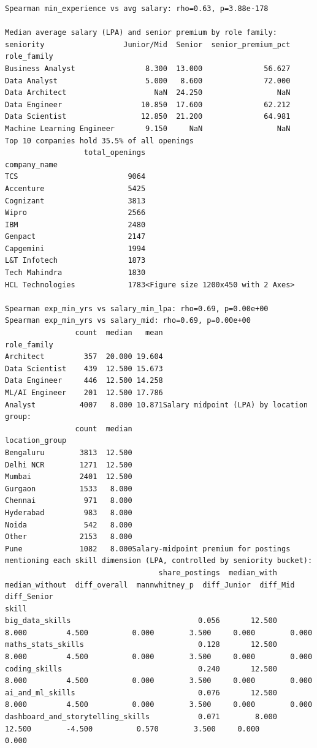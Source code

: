 \documentclass[conference]{IEEEtran}
\begin{document}
\begin{lstlisting}[style=outputstyle,caption={Execution Output G.9: Market Premiums and Strategic Alignment.},label={out:market_bridge}]
Spearman min_experience vs avg salary: rho=0.63, p=3.88e-178

Median average salary (LPA) and senior premium by role family:
seniority                  Junior/Mid  Senior  senior_premium_pct
role_family                                                      
Business Analyst                8.300  13.000              56.627
Data Analyst                    5.000   8.600              72.000
Data Architect                    NaN  24.250                 NaN
Data Engineer                  10.850  17.600              62.212
Data Scientist                 12.850  21.200              64.981
Machine Learning Engineer       9.150     NaN                 NaN
Top 10 companies hold 35.5% of all openings
                  total_openings
company_name                    
TCS                         9064
Accenture                   5425
Cognizant                   3813
Wipro                       2566
IBM                         2480
Genpact                     2147
Capgemini                   1994
L&T Infotech                1873
Tech Mahindra               1830
HCL Technologies            1783<Figure size 1200x450 with 2 Axes>

Spearman exp_min_yrs vs salary_min_lpa: rho=0.69, p=0.00e+00
Spearman exp_min_yrs vs salary_mid: rho=0.69, p=0.00e+00
                count  median   mean
role_family                         
Architect         357  20.000 19.604
Data Scientist    439  12.500 15.673
Data Engineer     446  12.500 14.258
ML/AI Engineer    201  12.500 17.786
Analyst          4007   8.000 10.871Salary midpoint (LPA) by location group:
                count  median
location_group               
Bengaluru        3813  12.500
Delhi NCR        1271  12.500
Mumbai           2401  12.500
Gurgaon          1533   8.000
Chennai           971   8.000
Hyderabad         983   8.000
Noida             542   8.000
Other            2153   8.000
Pune             1082   8.000Salary-midpoint premium for postings mentioning each skill dimension (LPA, controlled by seniority bucket):
                                   share_postings  median_with  median_without  diff_overall  mannwhitney_p  diff_Junior  diff_Mid  diff_Senior
skill                                                                                                                                          
big_data_skills                             0.056       12.500           8.000         4.500          0.000        3.500     0.000        0.000
maths_stats_skills                          0.128       12.500           8.000         4.500          0.000        3.500     0.000        0.000
coding_skills                               0.240       12.500           8.000         4.500          0.000        3.500     0.000        0.000
ai_and_ml_skills                            0.076       12.500           8.000         4.500          0.000        3.500     0.000        0.000
dashboard_and_storytelling_skills           0.071        8.000          12.500        -4.500          0.570        3.500     0.000        0.000


\end{lstlisting}
\end{document}
